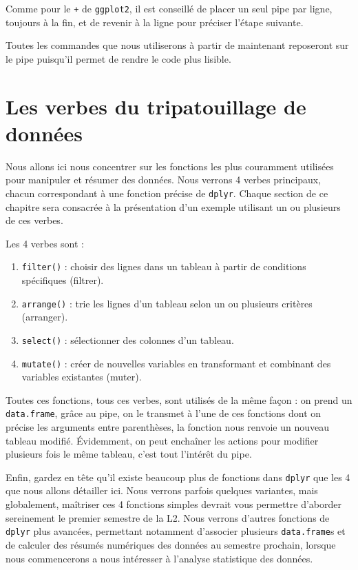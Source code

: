 \documentclass[
  a4paper,
  DIV=11,
  numbers=noendperiod,
  oneside]{scrreprt}
\providecommand{\tightlist}{%
  \setlength{\itemsep}{0pt}\setlength{\parskip}{0pt}}\usepackage{longtable,booktabs,array}
\begin{document}
Comme pour le \texttt{+} de \texttt{ggplot2}, il est conseillé de placer
un seul pipe par ligne, toujours à la fin, et de revenir à la ligne pour
préciser l'étape suivante.

Toutes les commandes que nous utiliserons à partir de maintenant
reposeront sur le pipe puisqu'il permet de rendre le code plus lisible.

\section{Les verbes du tripatouillage de
données}\label{les-verbes-du-tripatouillage-de-donnuxe9es}

Nous allons ici nous concentrer sur les fonctions les plus couramment
utilisées pour manipuler et résumer des données. Nous verrons 4 verbes
principaux, chacun correspondant à une fonction précise de
\texttt{dplyr}. Chaque section de ce chapitre sera consacrée à la
présentation d'un exemple utilisant un ou plusieurs de ces verbes.

Les 4 verbes sont :

\begin{enumerate}
\def\labelenumi{\arabic{enumi}.}
\tightlist
\item
  \texttt{filter()} : choisir des lignes dans un tableau à partir de
  conditions spécifiques (filtrer).
\item
  \texttt{arrange()} : trie les lignes d'un tableau selon un ou
  plusieurs critères (arranger).
\item
  \texttt{select()} : sélectionner des colonnes d'un tableau.
\item
  \texttt{mutate()} : créer de nouvelles variables en transformant et
  combinant des variables existantes (muter).
\end{enumerate}

Toutes ces fonctions, tous ces verbes, sont utilisés de la même façon :
on prend un \texttt{data.frame}, grâce au pipe, on le transmet à l'une
de ces fonctions dont on précise les arguments entre parenthèses, la
fonction nous renvoie un nouveau tableau modifié. Évidemment, on peut
enchaîner les actions pour modifier plusieurs fois le même tableau,
c'est tout l'intérêt du pipe.

Enfin, gardez en tête qu'il existe beaucoup plus de fonctions dans
\texttt{dplyr} que les 4 que nous allons détailler ici. Nous verrons
parfois quelques variantes, mais globalement, maîtriser ces 4 fonctions
simples devrait vous permettre d'aborder sereinement le premier semestre
de la L2. Nous verrons d'autres fonctions de \texttt{dplyr} plus
avancées, permettant notamment d'associer plusieurs \texttt{data.frame}s
et de calculer des résumés numériques des données au semestre prochain,
lorsque nous commencerons a nous intéresser à l'analyse statistique des
données.
\end{document}
